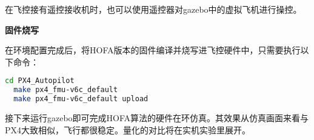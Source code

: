 在飞控接有遥控接收机时，也可以使用遥控器对gazebo中的虚拟飞机进行操控。

\textbf{固件烧写}

在环境配置完成后，将HOFA版本的固件编译并烧写进飞控硬件中，只需要执行以下命令：

\begin{lstlisting}[language=Bash, basicstyle=\footnotesize, linewidth=\linewidth, breaklines=true]
  cd PX4_Autopilot
  make px4_fmu-v6c_default
  make px4_fmu-v6c_default upload
\end{lstlisting}

接下来运行gazebo即可完成HOFA算法的硬件在环仿真。其效果从仿真画面来看与PX4大致相似，飞行都很稳定。量化的对比将在实机实验里展开。




